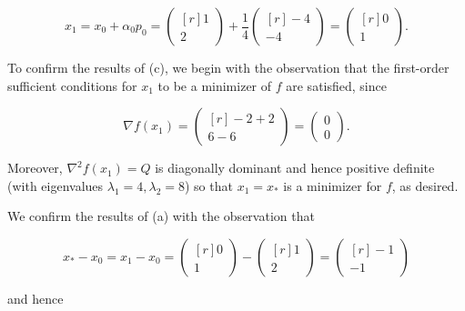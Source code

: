 \begin{solution}
    $$
    x_1 = x_0 + \alpha_0 p_0 = \begin{pmatrix*}[r]
        1 \\
        2
    \end{pmatrix*} + \frac{1}{4} \begin{pmatrix*}[r]
        -4 \\
        -4
    \end{pmatrix*} = \begin{pmatrix*}[r]
        0 \\
        1
    \end{pmatrix*}.
    $$

    To confirm the results of (c), we begin with the observation that the first-order sufficient conditions for $x_1$ to be a minimizer of 
    $f$ are satisfied, since

    $$
    \nabla f(x_1) = \begin{pmatrix*}[r]
        -2 + 2 \\
         6 - 6
    \end{pmatrix*} = \begin{pmatrix*}
        0 \\
        0
    \end{pmatrix*}.
    $$

    Moreover, $\nabla^2 f(x_1) = Q$ is diagonally dominant and hence positive definite (with eigenvalues 
    $\lambda_1 = 4, \lambda_2 = 8$) so that $x_1 = x_*$ is a minimizer for $f$, as desired.
    \pagebreak

    We confirm the results of (a) with the observation that

    $$
    x_* - x_0 = x_1 - x_0 = \begin{pmatrix*}[r]
        0 \\
        1
    \end{pmatrix*} - \begin{pmatrix*}[r]
        1 \\
        2
    \end{pmatrix*} = \begin{pmatrix*}[r]
        -1 \\
        -1
    \end{pmatrix*}
    $$

    and hence


\end{solution}
